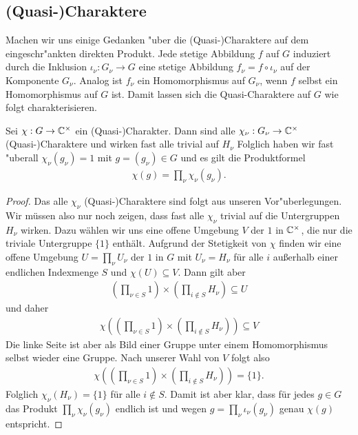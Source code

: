 \subsection{(Quasi-)Charaktere}%
		Machen wir uns einige Gedanken "uber die (Quasi-)Charaktere auf dem eingeschr"ankten direkten Produkt.
		Jede stetige Abbildung $f$ auf $G$ induziert durch die Inklusion $\iota_\nu: G_\nu \to G$ eine stetige Abbildung  $f_\nu = f \circ \iota_\nu$ auf der Komponente $G_\nu$.
		Analog ist $f_\nu$ ein Homomorphismus auf $G_\nu$, wenn $f$ selbst ein Homomorphismus auf $G$ ist.
		Damit lassen sich die Quasi-Charaktere auf $G$ wie folgt charakterisieren.
		\begin{lemma}\label{lemma:rdp:char}
			Sei $\chi:G \to \mathbb{C}^\times$ ein (Quasi-)Charakter. 
			Dann sind alle $\chi_\nu: G_\nu \to \mathbb{C}^\times$ (Quasi-)Charaktere und wirken fast alle trivial auf $H_\nu$
			Folglich haben wir fast "uberall $\chi_\nu (g_\nu) = 1$ mit $g=(g_\nu)\in G$ und es gilt die Produktformel
			\begin{align*}
				\chi(g) = \prod_\nu \chi_\nu(g_\nu).
			\end{align*}
		\end{lemma}
		\begin{proof}
			Das alle $\chi_\nu$ (Quasi-)Charaktere sind folgt aus unseren Vor"uberlegungen.
			Wir müssen also nur noch zeigen, dass fast alle $\chi_\nu$ trivial auf die Untergruppen $H_\nu$ wirken. 
			Dazu wählen wir uns eine offene Umgebung $V$ der $1$ in $\mathbb{C}^\times$, die nur die triviale Untergruppe $\{1\}$ enthält. 
			Aufgrund der Stetigkeit von $\chi$ finden wir eine offene Umgebung $U=\prod_\nu U_\nu$ der $1$ in $G$ mit $U_\nu = H_\nu$ für alle $i$ außerhalb einer endlichen Indexmenge $S$ und $\chi(U)\subseteq V$.
			Dann gilt aber
			\begin{align*}
				(\prod_{\nu\in S} 1) \times (\prod_{i \notin S} H_\nu) \subseteq U 
			\end{align*}
			und daher
			\begin{align*}
				\chi((\prod_{\nu\in S} 1) \times (\prod_{i \notin S} H_\nu)) \subseteq V 
			\end{align*}
			Die linke Seite ist aber als Bild einer Gruppe unter einem Homomorphismus selbst wieder eine Gruppe. 
			Nach unserer Wahl von $V$ folgt also
			\begin{align*}
				\chi((\prod_{\nu\in S} 1) \times (\prod_{i \notin S} H_\nu)) = \{1\}.
			\end{align*}
			Folglich $\chi_\nu (H_\nu) = \{1\}$ für alle $i\notin S$. 
			Damit ist aber klar, dass für jedes $g \in G$ das Produkt $\prod_\nu \chi_\nu(g_\nu)$ endlich ist und wegen $g = \prod_{\nu} \iota_\nu(g_\nu)$ genau $\chi(g)$ entspricht.
			
		\end{proof}

